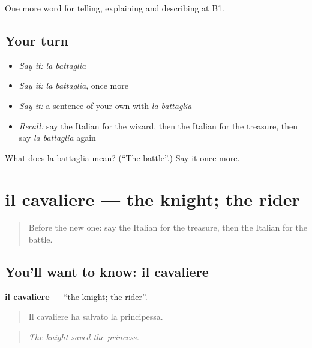 \begin{grammarlens}[title={What you've built}]
One more word for telling, explaining and describing at B1.
\end{grammarlens}

\subsection*{Your turn}
\begin{itemize}
\raggedright
  \item \emph{Say it:} \emph{la battaglia}
  \item \emph{Say it:} \emph{la battaglia}, once more
  \item \emph{Say it:} a sentence of your own with \emph{la battaglia}
  \item \emph{Recall:} say the Italian for the wizard, then the Italian for the treasure, then say \emph{la battaglia} again
\end{itemize}

\begin{tcolorbox}[breakable,colback=teal!4,colframe=teal!35!black,title={Before you move on}]
What does la battaglia mean? (\textquotedblleft{}The battle\textquotedblright{}.) Say it once more.
\end{tcolorbox}
\section[il cavaliere]{il cavaliere — the knight; the rider}

\label{lesson:IT-C327-cavaliere}



\begin{quote}
Before the new one: say the Italian for the treasure, then the Italian for the battle.
\end{quote}

\subsection*{You'll want to know: il cavaliere}
\textbf{il cavaliere} — \textquotedblleft{}the knight; the rider\textquotedblright{}.

\begin{quote}
Il cavaliere ha salvato la principessa.
\end{quote}

\begin{quote}
\emph{The knight saved the princess.}
\end{quote}

